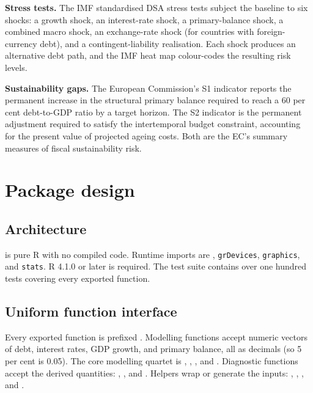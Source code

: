 \textbf{Stress tests.} The IMF standardised DSA stress tests
\citep{imf2013, imf2022} subject the baseline to six shocks: a
growth shock, an interest-rate shock, a primary-balance shock, a
combined macro shock, an exchange-rate shock (for countries with
foreign-currency debt), and a contingent-liability realisation.
Each shock produces an alternative debt path, and the IMF heat
map colour-codes the resulting risk levels.

\textbf{Sustainability gaps.} The European Commission's S1 indicator
reports the permanent increase in the structural primary balance
required to reach a 60 per cent debt-to-GDP ratio by a target
horizon. The S2 indicator is the permanent adjustment required to
satisfy the intertemporal budget constraint, accounting for the
present value of projected ageing costs. Both are the EC's
summary measures of fiscal sustainability risk.

\section{Package design}\label{package-design}

\subsection{Architecture}\label{architecture}

 is pure R with no compiled code. Runtime imports
are , \texttt{grDevices}, \texttt{graphics}, and \texttt{stats}. R 4.1.0
or later is required. The test suite contains over one hundred
tests covering every exported function.

\subsection{Uniform function interface}\label{uniform-function-interface}

Every exported function is prefixed . Modelling
functions accept numeric vectors of debt, interest rates, GDP
growth, and primary balance, all as decimals (so 5 per cent is
0.05). The core modelling quartet is ,
, , and
. Diagnostic functions accept the derived
quantities: ,
, and . Helpers
wrap or generate the inputs: ,
, , and
.

